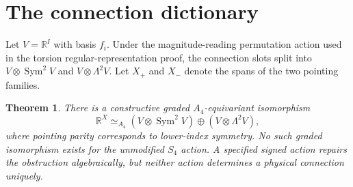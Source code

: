 \documentclass[10pt,a4paper,twocolumn]{article}
\newtheorem{theorem}{Theorem}
\newcommand{\R}{\mathbb R}
\begin{document}
\section*{The connection dictionary}
Let $V=\R^I$ with basis $f_i$. Under the magnitude-reading permutation action used in the torsion regular-representation proof, the connection slots split into $V\otimes\operatorname{Sym}^2 V$ and $V\otimes\Lambda^2V$. Let $X_+$ and $X_-$ denote the spans of the two pointing families.
\begin{theorem}
There is a constructive graded $A_4$-equivariant isomorphism
\begin{equation}
 \R^X \simeq_{A_4} (V\otimes\operatorname{Sym}^2 V)\oplus(V\otimes\Lambda^2V),
\end{equation}
where pointing parity corresponds to lower-index symmetry. No such graded isomorphism exists for the unmodified $S_4$ action. A specified signed action repairs the obstruction algebraically, but neither action determines a physical connection uniquely.
\end{theorem}
\end{document}
